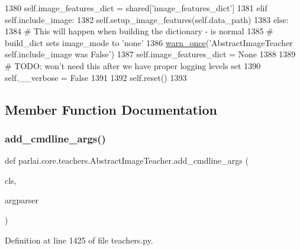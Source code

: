 \begin{DoxyCode}
1380                 self.image\_features\_dict = shared[\textcolor{stringliteral}{'image\_features\_dict'}]
1381         \textcolor{keywordflow}{elif} self.include\_image:
1382             self.setup\_image\_features(self.data\_path)
1383         \textcolor{keywordflow}{else}:
1384             \textcolor{comment}{# This will happen when building the dictionary - is normal}
1385             \textcolor{comment}{# build\_dict sets image\_mode to 'none'}
1386             \hyperlink{namespaceparlai_1_1utils_1_1misc_a884a3aefa90581f53bc592fa6a78dc43}{warn\_once}(\textcolor{stringliteral}{'AbstractImageTeacher self.include\_image was False'})
1387             self.image\_features\_dict = \textcolor{keywordtype}{None}
1388 
1389         \textcolor{comment}{# TODO: won't need this after we have proper logging levels set}
1390         self.\_\_verbose = \textcolor{keyword}{False}
1391 
1392         self.reset()
1393 
\end{DoxyCode}


\subsection{Member Function Documentation}
\mbox{\label{classparlai_1_1core_1_1teachers_1_1AbstractImageTeacher_a2735899e5787c14da39443179db6c84b}} 
\subsubsection{\texorpdfstring{add\+\_\+cmdline\+\_\+args()}{add\_cmdline\_args()}}
{\footnotesize\ttfamily def parlai.\+core.\+teachers.\+Abstract\+Image\+Teacher.\+add\+\_\+cmdline\+\_\+args (\begin{DoxyParamCaption}\item[{}]{cls,  }\item[{}]{argparser }\end{DoxyParamCaption})}



Definition at line 1425 of file teachers.\+py.


